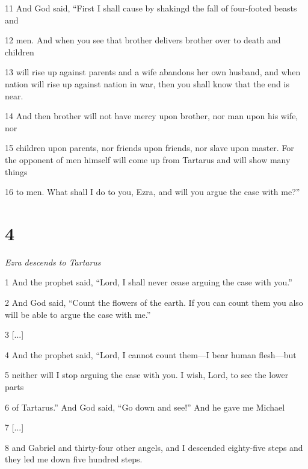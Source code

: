 \par 11 And God said, “First I shall cause by shakingd the fall of four-footed beasts and

\par 12 men. And when you see that brother delivers brother over to death and children

\par 13 will rise up against parents and a wife abandons her own husband, and when nation will rise up against nation in war, then you shall know that the end is near.

\par 14 And then brother will not have mercy upon brother, nor man upon his wife, nor

\par 15 children upon parents, nor friends upon friends, nor slave upon master. For the opponent of men himself will come up from Tartarus and will show many things

\par 16 to men. What shall I do to you, Ezra, and will you argue the case with me?”

\chapter{4}

\par \textit{Ezra descends to Tartarus}

\par 1 And the prophet said, “Lord, I shall never cease arguing the case with you.”

\par 2 And God said, “Count the flowers of the earth. If you can count them you also will be able to argue the case with me.”

\par 3 [...]

\par 4 And the prophet said, “Lord, I cannot count them—I bear human flesh—but

\par 5 neither will I stop arguing the case with you. I wish, Lord, to see the lower parts

\par 6 of Tartarus.” And God said, “Go down and see!” And he gave me Michael

\par 7 [...]

\par 8 and Gabriel and thirty-four other angels, and I descended eighty-five steps and they led me down five hundred steps.

